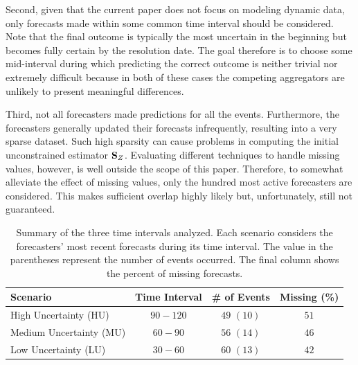 \documentclass[11pt]{article}
\theoremstyle{definition}
\theoremstyle{definition}
\def\SS{{\bf S}}
\begin{document}

Second, given that the current paper does not focus on modeling dynamic data, only forecasts made within some common time interval should be considered.  Note that the final outcome is typically the most uncertain in the beginning but becomes fully certain by the resolution date. The goal therefore is to choose some mid-interval during which predicting the correct outcome is neither trivial nor extremely difficult because in both of these cases the competing aggregators are unlikely to present meaningful differences. 

Third, not all forecasters made predictions for all the events. Furthermore, the forecasters generally updated their forecasts infrequently, resulting into a very sparse dataset. Such high sparsity can cause problems in  computing the initial unconstrained estimator $\SS_Z$. 
Evaluating different techniques to handle missing values, however, is well outside the scope of this paper. Therefore, to somewhat alleviate the effect of missing values, only the hundred most active forecasters are considered. This makes sufficient overlap highly likely but, unfortunately, still not guaranteed. 


\begin{table}[t!]
   \centering
   \begin{tabular}{l ccc } %
      Scenario      & Time Interval & \# of Events & Missing (\%)  \\\hline
      High Uncertainty (HU)        & $90-120$     & $49$ $(10)$ & $51$\\ 
      Medium Uncertainty (MU)       & $60-90$  &  $56$ $(14)$  & $46$ \\
      Low Uncertainty (LU) &  $30-60$ & $60$ $(13)$ & $42$\\
   \end{tabular}
   \caption{Summary of the three time intervals analyzed. Each scenario considers the forecasters' most recent forecasts during its time interval. The value in the parentheses represent the number of events occurred. The final column shows the percent of missing forecasts. }
   \label{scenarios}
\end{table}
\end{document}
